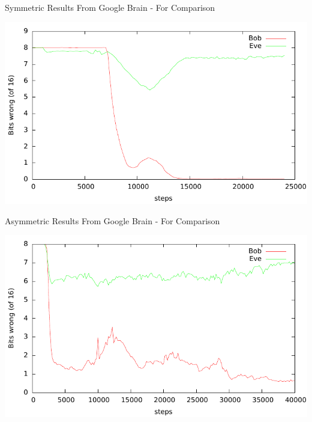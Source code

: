\documentclass{beamer}
\begin{document}
		\begin{frame}{Symmetric Results From Google Brain - For Comparison}
			\begin{center}
				\includegraphics[height=0.8\textheight]{cryptolearn_batch_tighter}
			\end{center}
		\end{frame}
		\begin{frame}{Asymmetric Results From Google Brain - For Comparison}
			\begin{center}
				\includegraphics[height=0.8\textheight]{pubkey_bob_v_eve}
			\end{center}
		\end{frame}
\end{document}
